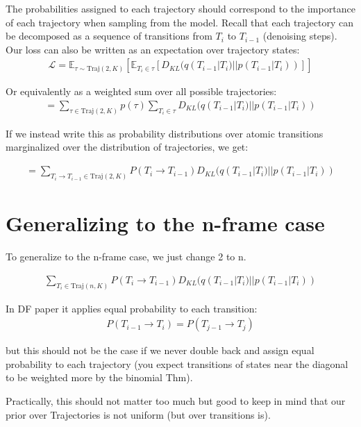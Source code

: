 \documentclass[11pt]{article}
\begin{document}
The probabilities assigned to each trajectory should correspond to the importance of each trajectory when sampling from the model. Recall that each trajectory can be decomposed as a sequence of transitions from $T_i$ to $T_{i-1}$ (denoising steps). Our loss can also be written as an expectation over trajectory states:
\begin{align}
\mathcal{L} = \mathbb{E}_{\tau \sim \text{Traj}(2,K)} \left[ \mathbb{E}_{T_i \in \tau} \left[ D_{KL}(q(T_{i-1} | T_i) || p(T_{i-1} | T_i)) \right] \right]
\end{align}

Or equivalently as a weighted sum over all possible trajectories:
\begin{align}
= \sum_{\tau \in \text{Traj}(2,K)} p(\tau) \sum_{T_i \in \tau} D_{KL}(q(T_{i-1} | T_i) || p(T_{i-1} | T_i))
\end{align}

If we instead write this as probability distributions over atomic transitions marginalized over the distribution of trajectories, we get:

\begin{align}
= \sum_{T_i \rightarrow T_{i-1} \in \text{Traj}(2,K)} P(T_i \rightarrow T_{i-1}) D_{KL}(q(T_{i-1} | T_i) || p(T_{i-1} | T_i))
\end{align}

\section{Generalizing to the n-frame case}

To generalize to the n-frame case, we just change 2 to n.

\begin{align}
\sum_{T_i \in \text{Traj}(n,K)} P(T_i \rightarrow T_{i-1}) D_{KL}(q(T_{i-1} | T_i) || p(T_{i-1} | T_i))
\end{align}

In DF paper it applies equal probability to each transition:
\begin{align}
P(T_{i-1} \rightarrow T_i) = P(T_{j-1} \rightarrow T_j) 
\end{align}

but this should not be the case if we never double back and assign equal probability to each trajectory (you expect transitions of states near the diagonal to be weighted more by the binomial Thm).

Practically, this should not matter too much but good to keep in mind that our prior over Trajectories is not uniform (but over transitions is).
\end{document}
